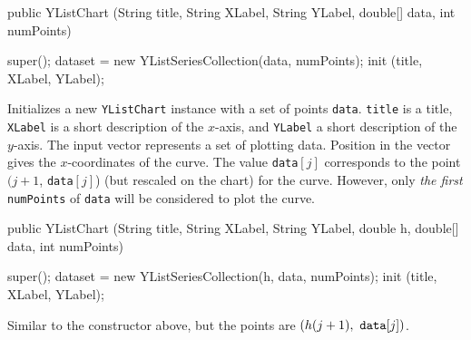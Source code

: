 \begin{htmlonly}
\end{htmlonly}
\begin{code}

   public YListChart (String title, String XLabel, String YLabel,
                      double[] data, int numPoints) \begin{hide} {
      super();
      dataset = new YListSeriesCollection(data, numPoints);
      init (title, XLabel, YLabel);
   }\end{hide}
\end{code}
\begin{tabb}
   Initializes a new \texttt{YListChart} instance with a set of points
   \texttt{data}.
   \texttt{title} is a title, \texttt{XLabel} is a short description of
   the $x$-axis, and \texttt{YLabel}  a short description of the $y$-axis.
   The input vector represents a set of plotting data.
   Position in the vector gives the $x$-coordinates of the curve.
   The value \texttt{data}$[j]$ corresponds to the point
   $(j+1$, \texttt{data}$[j]$) (but rescaled on the chart) for the curve.
   However, only \emph{the first} \texttt{numPoints} of \texttt{data}
    will be considered to plot the curve.
\end{tabb}
\begin{htmlonly}
\end{htmlonly}
\begin{code}

   public YListChart (String title, String XLabel, String YLabel,
                      double h, double[] data, int numPoints) \begin{hide} {
      super();
      dataset = new YListSeriesCollection(h, data, numPoints);
      init (title, XLabel, YLabel);
   }\end{hide}
\end{code}
\begin{tabb}
   Similar to the constructor %
   above, but the points are $(h(j+1),\ \mbox{\texttt{data}}[j])$.
\end{tabb}
